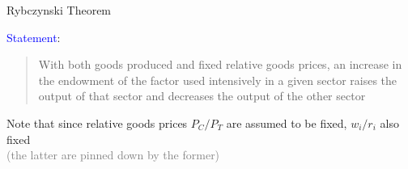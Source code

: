 \documentclass[notes,11pt, aspectratio=169, xcolor=table]{beamer}
\newcommand{\blue}[1]{\textcolor{blue}{#1}}
\newenvironment{wideitemize}{\itemize\addtolength{\itemsep}{10pt}}{\enditemize}
\begin{document}
\begin{frame}{Rybczynski Theorem}

        \begin{wideitemize}
            \item \blue{Statement}:

            \begin{quote}
                With both goods produced and fixed relative goods prices, an increase in the endowment of the factor used intensively in a given sector raises the output of that sector and decreases the output of the other sector
            \end{quote}


            \item<2-> Note that since relative goods prices $P_C/P_T$ are assumed to be fixed, $w_i/r_i$ also fixed \\
                \qquad \textcolor{gray}{(the latter are pinned down by the former)}
                    
\end{wideitemize}
\end{frame}
\end{document}
